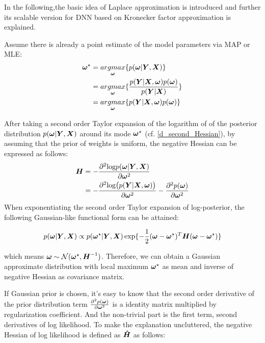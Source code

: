 In the following,the basic idea of Laplace approximation is introduced and further its scalable version for DNN based on Kronecker factor approximation is explained.

Assume there is already a point estimate of the model parameters via \gls{MAP} or \gls{MLE}:
\begin{equation}
\begin{aligned} \label{point estimate}
\boldsymbol \omega^\star &= \underset{\boldsymbol \omega}{argmax}\{p(\boldsymbol \omega|\boldsymbol Y,\boldsymbol X)\} \\
&= \underset{\boldsymbol \omega}{argmax}\{\frac{p(\boldsymbol Y|\boldsymbol X, \boldsymbol \omega) p(\boldsymbol \omega)}{p(\boldsymbol Y | \boldsymbol X)}\} \\
&= \underset{\boldsymbol \omega}{argmax}\{p(\boldsymbol Y|\boldsymbol X, \boldsymbol \omega) p(\boldsymbol \omega)\}
\end{aligned}
\end{equation}


After taking a second order Taylor expansion of the logarithm of of the posterior distribution $p(\boldsymbol \omega | \boldsymbol Y, \boldsymbol X)$ around its mode $\boldsymbol \omega^\star$ (cf. \ref{d_second_Hessian}), by assuming that the prior of weights is uniform, the negative Hessian can be expressed as follows:
\[
\begin{aligned}
\boldsymbol H &= -\frac{\partial^2\text{log} p(\boldsymbol \omega|\boldsymbol Y, \boldsymbol X)}{\partial \boldsymbol \omega^2}\\
&=-\frac{\partial^2\text{log}\big(p(\boldsymbol Y|\boldsymbol X, \boldsymbol \omega)\big)}{\partial \boldsymbol \omega^2} - \frac{\partial^2p(\boldsymbol \omega)}{\partial\boldsymbol \omega^2}
\end{aligned}
\]
When exponentiating the second order Taylor expansion of log-posterior, the following Gaussian-like functional form can be attained: 

\begin{equation}
\begin{aligned}\label{gaussian form}
p(\boldsymbol \omega | \boldsymbol Y, \boldsymbol X) \propto p(\boldsymbol \omega^\star|\boldsymbol Y, \boldsymbol X)\exp\{-\frac{1}{2}(\boldsymbol \omega - \boldsymbol \omega^\star)^T\boldsymbol H (\boldsymbol \omega - \boldsymbol \omega^\star)\}
\end{aligned}
\end{equation}

which means $\boldsymbol \omega \sim \mathcal N(\boldsymbol \omega^\star, \boldsymbol H ^{-1})$. Therefore, we can obtain a Gaussian approximate distribution with local maximum $\boldsymbol \omega^\star$ as mean and inverse of negative Hessian as covariance matrix.

If Gaussian prior is chosen, it's easy to know that the second order derivative of the prior distribution term $\frac{\partial^2p(\boldsymbol \omega)}{\partial\boldsymbol \omega^2}$ is a identity matrix multiplied by regularization coefficient. And the non-trivial part is the first term, second derivatives of log likelihood. To make the explanation uncluttered, the negative Hessian of log likelihood is defined as $\boldsymbol{\hat{H}}$ as follows:

